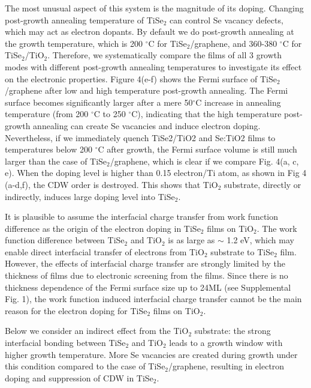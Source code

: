 \documentclass[journal=nalefd,manuscript=letter]{achemso}
\begin{document}
The most unusual aspect of this system is the magnitude of its doping.
Changing post-growth annealing temperature of TiSe$_2$ can control Se vacancy defects, which may act as electron dopants\cite{PengMa15prb}.
By default we do post-growth annealing at the growth temperature, which is 200 $^\circ$C for TiSe$_2$/graphene, and 360-380 $^\circ$C for TiSe$_2$/TiO$_2$.
Therefore, we systematically compare the films of all 3 growth modes with different post-growth annealing temperatures to investigate its effect on the electronic properties.
Figure 4(e-f) shows the Fermi surface of TiSe$_2$/graphene after low and high temperature post-growth annealing.
The Fermi surface becomes significantly larger after a mere 50$^\circ$C increase in annealing temperature (from 200 $^\circ$C to 250 $^\circ$C), indicating that the high temperature post-growth annealing can create Se vacancies and induce electron doping.
Nevertheless, if we immediately quench TiSe2/TiO2 and Se:TiO2 films to temperatures below 200 $^\circ$C after growth, the Fermi surface volume is still much larger than the case of TiSe$_2$/graphene, which is clear if we compare Fig. 4(a, c, e).
When the doping level is higher than 0.15 electron/Ti atom, as shown in Fig 4 (a-d,f), the CDW order is destroyed. 
This shows that TiO$_2$ substrate, directly or indirectly, induces large doping level into TiSe$_2$.

It is plausible to assume the interfacial charge transfer from work function difference as the origin of the electron doping in TiSe$_2$ films on TiO$_2$.
The work function difference between TiSe$_2$\cite{LiuWei16SA} and TiO$_2$\cite{ImanishiYoshihiro07JPCC} is as large as $\sim$ 1.2 eV, which may enable direct interfacial transfer of electrons from TiO$_2$ substrate to TiSe$_2$ film.
However, the effects of interfacial charge transfer are strongly limited by the thickness of films due to electronic screening from the films.
Since there is no thickness dependence of the Fermi surface size up to 24ML (see Supplemental Fig. 1), the work function induced interfacial charge transfer cannot be the main reason for the electron doping for TiSe$_2$ films on TiO$_2$.

Below we consider an indirect effect from the TiO$_2$ substrate: the strong interfacial bonding between TiSe$_2$ and TiO$_2$ leads to a growth window with higher growth temperature. More Se vacancies are created during growth under this condition compared to the case of TiSe$_2$/graphene, resulting in electron doping and suppression of CDW in TiSe$_2$.
\end{document}
